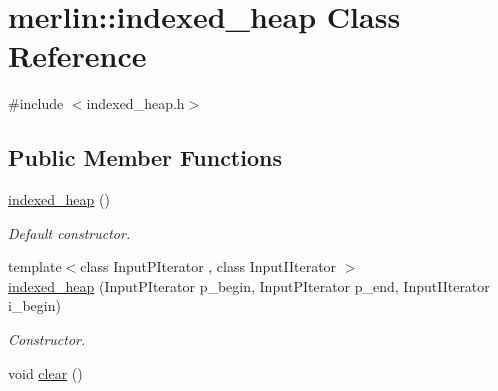 \hypertarget{classmerlin_1_1indexed__heap}{}\section{merlin\+:\+:indexed\+\_\+heap Class Reference}
\label{classmerlin_1_1indexed__heap}


{\ttfamily \#include $<$indexed\+\_\+heap.\+h$>$}

\subsection*{Public Member Functions}
\begin{DoxyCompactItemize}
\item 
\hypertarget{classmerlin_1_1indexed__heap_a40ea288cdd3efb144b3fd1932720faec}{}\hyperlink{classmerlin_1_1indexed__heap_a40ea288cdd3efb144b3fd1932720faec}{indexed\+\_\+heap} ()\label{classmerlin_1_1indexed__heap_a40ea288cdd3efb144b3fd1932720faec}

\begin{DoxyCompactList}\small\item\em Default constructor. \end{DoxyCompactList}\item 
\hypertarget{classmerlin_1_1indexed__heap_a19f224637f41b40dfb77dd5b1ecd4906}{}{\footnotesize template$<$class Input\+P\+Iterator , class Input\+I\+Iterator $>$ }\\\hyperlink{classmerlin_1_1indexed__heap_a19f224637f41b40dfb77dd5b1ecd4906}{indexed\+\_\+heap} (Input\+P\+Iterator p\+\_\+begin, Input\+P\+Iterator p\+\_\+end, Input\+I\+Iterator i\+\_\+begin)\label{classmerlin_1_1indexed__heap_a19f224637f41b40dfb77dd5b1ecd4906}

\begin{DoxyCompactList}\small\item\em Constructor. \end{DoxyCompactList}\item 
\hypertarget{classmerlin_1_1indexed__heap_ae77fc9d651b4b1887a0cdf2be337c3d8}{}void \hyperlink{classmerlin_1_1indexed__heap_ae77fc9d651b4b1887a0cdf2be337c3d8}{clear} ()\label{classmerlin_1_1indexed__heap_ae77fc9d651b4b1887a0cdf2be337c3d8}


\end{DoxyCompactItemize}
